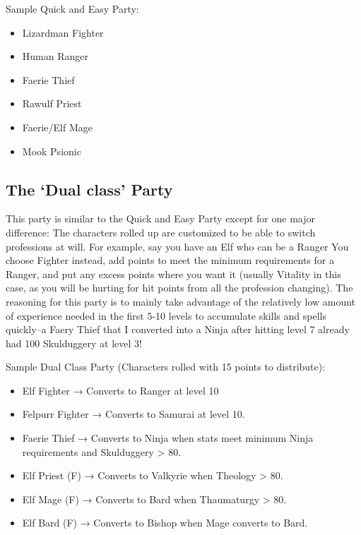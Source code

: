 \documentclass[12pt]{article}
\providecommand{\tightlist}{%
  \setlength{\itemsep}{0pt}\setlength{\parskip}{0pt}}
\begin{document}
Sample Quick and Easy Party:

\begin{itemize}
\tightlist
\item
  Lizardman Fighter
\item
  Human Ranger
\item
  Faerie Thief
\item
  Rawulf Priest
\item
  Faerie/Elf Mage
\item
  Mook Psionic
\end{itemize}

\subsection{\texorpdfstring{The `Dual class'
Party}{The Dual class Party}}\label{the-dual-class-party}

This party is similar to the Quick and Easy Party except for one major
difference: The characters rolled up are customized to be able to switch
professions at will. For example, say you have an Elf who can be a
Ranger You choose Fighter instead, add points to meet the minimum
requirements for a Ranger, and put any excess points where you want it
(usually Vitality in this case, as you will be hurting for hit points
from all the profession changing). The reasoning for this party is to
mainly take advantage of the relatively low amount of experience needed
in the first 5-10 levels to accumulate skills and spells quickly--a
Faery Thief that I converted into a Ninja after hitting level 7 already
had 100 Skulduggery at level 3!

Sample Dual Class Party (Characters rolled with 15 points to
distribute):

\begin{itemize}
\tightlist
\item
  Elf Fighter → Converts to Ranger at level 10
\item
  Felpurr Fighter → Converts to Samurai at level 10.
\item
  Faerie Thief → Converts to Ninja when stats meet minimum Ninja
  requirements and Skulduggery \textgreater{} 80.
\item
  Elf Priest (F) → Converts to Valkyrie when Theology \textgreater{} 80.
\item
  Elf Mage (F) → Converts to Bard when Thaumaturgy \textgreater{} 80.
\item
  Elf Bard (F) → Converts to Bishop when Mage converts to Bard.
\end{itemize}
\end{document}
